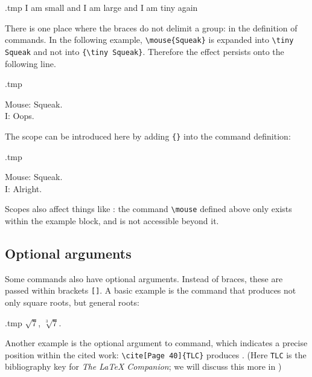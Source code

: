 \begin{VerbatimOut}{\jobname.tmp}
\tiny I am small and
{\Large I am large}
and I am tiny again
\end{VerbatimOut}
\ShowExample

There is one place where the braces do not delimit a group:
in the definition of commands.
In the following example, \verb|\mouse{Squeak}| is expanded into
\verb|\tiny Squeak| and not into \verb|{\tiny Squeak}|.
Therefore the effect persists onto the following line.
%
\begin{VerbatimOut}{\jobname.tmp}
\newcommand{\mouse}[1]{Mouse: \tiny#1.}

\mouse{Squeak}\\
I: Oops.
\end{VerbatimOut}
\ShowExample
%
The scope can be introduced here by adding \verb|{}| into the command definition:
%
\begin{VerbatimOut}{\jobname.tmp}
\newcommand{\mouse}[1]{{Mouse: \tiny#1.}}

\mouse{Squeak}\\
I: Alright.
\end{VerbatimOut}
\ShowExample

Scopes also affect things like :
the command \verb|\mouse| defined above only exists
within the example block, and is not accessible beyond it.



%
\subsection{Optional arguments}

Some commands also have optional arguments.
Instead of braces, these are passed within brackets \verb|[]|.
A basic example is the  command
that produces not only square roots, but general roots:
\begin{VerbatimOut}{\jobname.tmp}
$\sqrt{7}$,
$\sqrt[3]{7}$.
\end{VerbatimOut}
\ShowExample

Another example is the optional argument to  command,
which indicates a precise position within the cited work:
\verb|\cite[Page 40]{TLC}| produces \cite[Page 40]{TLC}.
(Here \verb|TLC| is the bibliography key for \emph{The \LaTeX{} Companion};
we will discuss this more in )

